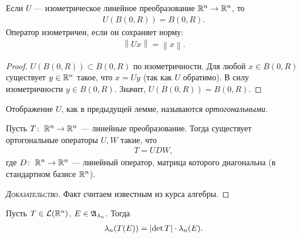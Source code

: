 \begin{lm}
 Если $U$ --- изометрическое линейное преобразование $\mathbb{R}^{n} \to \mathbb{R}^{n}$, то \begin{align*}
  U(B(0, R)) = B(0, R)
 .\end{align*} Оператор изометричен, если он сохраняет норму: \begin{align*}
  \left\| Ux \right\| = \left\| x \right\|
 .\end{align*} 
\end{lm}
\begin{proof}
 $U(B(0, R)) \subset B(0, R)$ по изометричности. Для любой $x \in B(0, R)$ существует $y \in \mathbb{R}^{n}$ такое, что $x = Uy$ (так как $U$ обратимо). В силу изометричности $y \in B(0, R)$. Значит, $U(B(0, R)) = B(0, R)$.
\end{proof}
\begin{df}
 Отображение $U$, как в предыдущей лемме, называются \textit{ортогональными}.
\end{df}
\begin{lm}
 Пусть $T \colon\; \mathbb{R}^{n} \to \mathbb{R}^{n}$ --- линейные преобразование. Тогда существует ортогональные операторы $U, W$ такие, что \begin{align*}
  T = UDW,
 \end{align*} где $D \colon\; \mathbb{R}^{n} \to \mathbb{R}^{n}$ --- линейный оператор, матрица которого диагональна (в стандартном базисе $\mathbb{R}^{n}$).
\end{lm}
\begin{proof}[\normalfont\textsc{Доказательство}]
 Факт считаем известным из курса алгебры.
\end{proof}
\newcommand{\LL}{\ensuremath \mathcal{L}}
\begin{thm}[%
]
 Пусть $T \in \mathcal{L}(\mathbb{R}^{n})$, $E \in \mathfrak{A}_{\lambda_n}$. Тогда \begin{align*}
  \lambda_n(T(E)) = \left| \det T \right| \cdot \lambda_n(E)
 .\end{align*} 
\end{thm}
